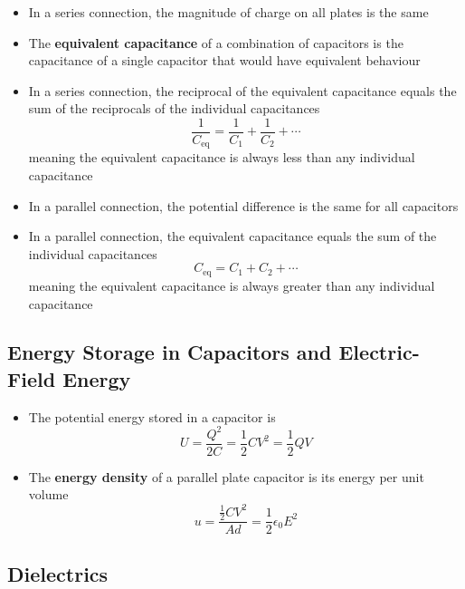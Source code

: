 \documentclass{article}
\begin{document}
\begin{itemize}
  \item In a series connection, the magnitude of charge on all plates is the same

  \item The \textbf{equivalent capacitance} of a combination of capacitors is the capacitance of a single capacitor that would have equivalent behaviour

  \item In a series connection, the reciprocal of the equivalent capacitance equals the sum of the reciprocals of the individual capacitances \[\frac{1}{C_\textrm{eq}} = \frac{1}{C_1} + \frac{1}{C_2} + \cdots\] meaning the equivalent capacitance is always less than any individual capacitance

  \item In a parallel connection, the potential difference is the same for all capacitors

  \item In a parallel connection, the equivalent capacitance equals the sum of the individual capacitances \[C_\textrm{eq} = C_1 + C_2 + \cdots\] meaning the equivalent capacitance is always greater than any individual capacitance
\end{itemize}

\subsection{Energy Storage in Capacitors and Electric-Field Energy}

\begin{itemize}
  \item The potential energy stored in a capacitor is \[U = \frac{Q^2}{2 C} = \frac{1}{2} C V^2 = \frac{1}{2} Q V\]

  \item The \textbf{energy density} of a parallel plate capacitor is its energy per unit volume \[u = \frac{\frac{1}{2} C V^2}{A d} = \frac{1}{2} \epsilon_0 E^2\]
\end{itemize}

\subsection{Dielectrics}
\end{document}
